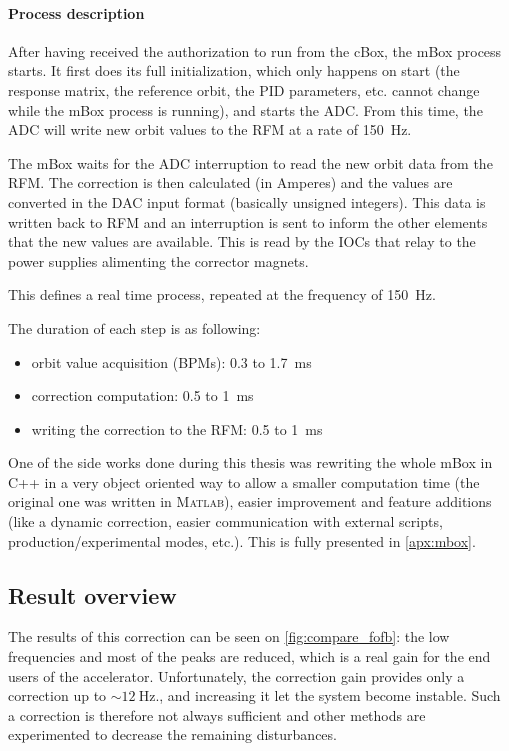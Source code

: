 \paragraph{Process description}
After having received the authorization to run from the cBox, the mBox process starts. It first does its full initialization, which only happens on start (the response matrix, the reference orbit, the PID parameters, etc. cannot change while the mBox process is running), and starts the ADC. From this time, the ADC will write new orbit values to the RFM at a rate of \SI{150}{\hertz}.

The mBox waits for the ADC interruption to read the new orbit data from the RFM. The correction is then calculated (in Amperes) and the values are converted in the DAC input format (basically unsigned integers). This data is written back to RFM and an interruption is sent to inform the other elements that the new values are available. This is read by the IOCs that relay to the power supplies alimenting the corrector magnets.

This defines a real time process, repeated at the frequency of \SI{150}{\hertz}.

The duration of each step is as following:
\begin{itemize}
\item orbit value acquisition (BPMs): 0.3 to \SI{1.7}{\milli\second}
\item correction computation: 0.5 to \SI{1}{\milli\second}
\item writing the correction to the RFM: 0.5 to \SI{1}{\milli\second}
\end{itemize}

\remark One of the side works done during this thesis was rewriting the whole mBox in C++ in a very object oriented way to allow a smaller computation time (the original one was written in \textsc{Matlab}), easier improvement and feature additions (like a dynamic correction, easier communication with external scripts, production/experimental modes, etc.). This is fully presented in \cref{apx:mbox}.

\subsection{Result overview}
The results of this correction can be seen on \cref{fig:compare_fofb}: the low frequencies and most of the peaks are reduced, which is a real gain for the end users of the accelerator. Unfortunately, the correction gain provides only a correction up to $\sim\!\SI{12}{\hertz}$., and increasing it let the system become instable. Such a correction is therefore not always sufficient and other methods are experimented to decrease the remaining disturbances.

